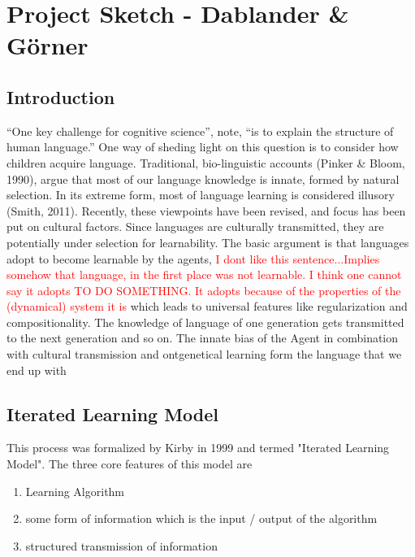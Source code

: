 \documentclass[12pt]{scrartcl}
\begin{document}
\section*{Project Sketch - Dablander \& Görner}

\subsection*{Introduction}
``One key challenge for cognitive science'', \textcite[p. 5241]{kirby2007innateness} note, ``is to explain
the structure of human language.'' One way of sheding light on this question is to consider
how children acquire language. Traditional, bio-linguistic accounts (Pinker \& Bloom, 1990),
argue that most of our language knowledge is innate, formed by natural selection. In its extreme form, most of language learning is considered illusory (Smith, 2011). Recently, these viewpoints have been revised, and focus has been put on cultural factors. Since
languages are culturally transmitted, they are potentially under selection for learnability.
The basic argument is that languages adopt to become learnable by the agents, \textcolor{red}{I dont like this sentence...Implies somehow that language, in the first place was not learnable. I think one cannot say it adopts TO DO SOMETHING. It adopts because of the properties of the (dynamical) system it is} which leads to
universal features like regularization and compositionality. The knowledge of language of one
generation gets transmitted to the next generation and so on. The innate bias of the Agent in combination with cultural transmission and ontgenetical learning form the language that we end up with 

\subsection*{Iterated Learning Model}

This process was formalized by Kirby in 1999 and termed "Iterated Learning Model". The
three core features of this model \parencite{ferdinand2008language} are

\begin{enumerate}
  \item Learning Algorithm
  \item some form of information which is the input / output of the algorithm
  \item structured transmission of information
\end{enumerate}
\end{document}
